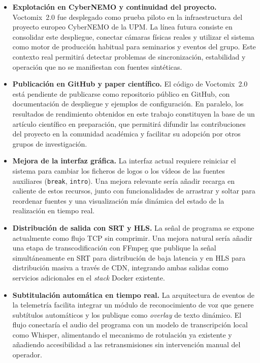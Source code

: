\begin{itemize}
  \item \textbf{Explotación en CyberNEMO y continuidad del proyecto.}
  Voctomix~2.0 fue desplegado como prueba piloto en la infraestructura del
  proyecto europeo CyberNEMO de la UPM. La línea futura consiste en consolidar
  este despliegue, conectar cámaras físicas reales y utilizar el sistema como
  motor de producción habitual para seminarios y eventos del grupo. Este
  contexto real permitirá detectar problemas de sincronización, estabilidad y
  operación que no se manifiestan con fuentes sintéticas.

  \item \textbf{Publicación en GitHub y paper científico.}
  El código de Voctomix~2.0 está pendiente de publicarse como repositorio público
  en GitHub, con documentación de despliegue y ejemplos de configuración. En
  paralelo, los resultados de rendimiento obtenidos en este trabajo constituyen
  la base de un artículo científico en preparación, que permitirá difundir las
  contribuciones del proyecto en la comunidad académica y facilitar su adopción
  por otros grupos de investigación.

  \item \textbf{Mejora de la interfaz gráfica.}
  La interfaz actual requiere reiniciar el sistema para cambiar los ficheros de
  logos o los vídeos de las fuentes auxiliares (\texttt{break}, \texttt{intro}).
  Una mejora relevante sería añadir recarga en caliente de estos recursos, junto
  con funcionalidades de arrastrar y soltar para reordenar fuentes y una
  visualización más dinámica del estado de la realización en tiempo real.

  \item \textbf{Distribución de salida con SRT y HLS.}
  La señal de programa se expone actualmente como flujo TCP sin comprimir. Una
  mejora natural sería añadir una etapa de transcodificación con FFmpeg que
  publique la señal simultáneamente en \acs{SRT} para distribución de baja
  latencia y en \acs{HLS} para distribución masiva a través de \acs{CDN},
  integrando ambas salidas como servicios adicionales en el \textit{stack} Docker existente.

  \item \textbf{Subtitulación automática en tiempo real.}
  La arquitectura de eventos de la telemetría facilita integrar un módulo de
  reconocimiento de voz que genere subtítulos automáticos y los publique como
  \textit{overlay} de texto dinámico. El flujo conectaría el audio del programa con un
  modelo de transcripción local como Whisper, alimentando el mecanismo de
  rotulación ya existente y añadiendo accesibilidad a las retransmisiones sin
  intervención manual del operador.

\end{itemize}
